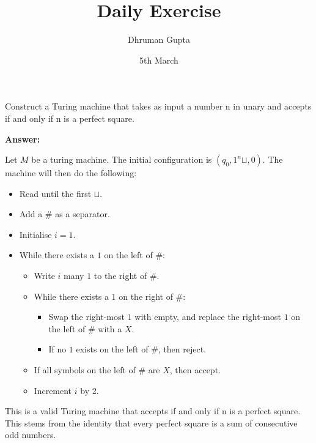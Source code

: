 \documentclass[11pt]{article}
\title{Daily Exercise}
\author{Dhruman Gupta}
\date{5th March}
\begin{document}

Construct a Turing machine that takes as input a number n in unary and accepts if and only if n is a perfect square.

\textbf{Answer:}

Let $M$ be a turing machine. The initial configuration is $(q_0, 1^n\sqcup, 0)$. The machine will then do the following:

\begin{itemize}
    \item Read until the first $\sqcup$.
    \item Add a $\#$ as a separator.
    \item Initialise $i = 1$.
    \item While there exists a $1$ on the left of $\#$:
    \begin{itemize}
        \item Write $i$ many $1$ to the right of $\#$.
        \item While there exists a $1$ on the right of $\#$:
        \begin{itemize}
            \item Swap the right-most $1$ with empty, and replace the right-most $1$ on the left of $\#$ with a $X$.
            \item If no $1$ exists on the left of $\#$, then reject.
        \end{itemize}
        \item If all symbols on the left of $\#$ are $X$, then accept.
        \item Increment $i$ by 2.
    \end{itemize}
\end{itemize}

This is a valid Turing machine that accepts if and only if n is a perfect square. This stems from the identity that every perfect square is a sum of consecutive odd numbers.
\end{document}
